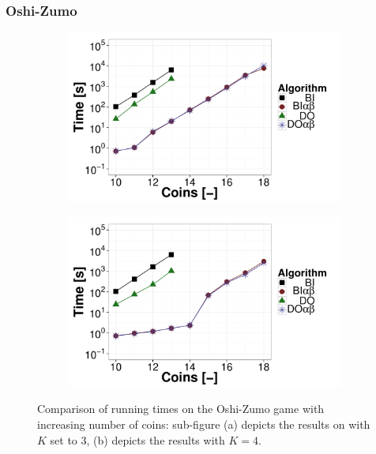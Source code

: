 \subsubsection{Oshi-Zumo}
\begin{figure}
\centering
	\begin{subfigure}{0.49\textwidth}
		\includegraphics[width=1\textwidth]{figures/OZ-K3.pdf}\caption{}\label{fig:off:res:oz3}
	\end{subfigure}
	\begin{subfigure}{0.49\textwidth}
		\includegraphics[width=1\textwidth]{figures/OZ-K4.pdf}\caption{}\label{fig:off:res:oz4}
	\end{subfigure}
\caption{Comparison of running times on the Oshi-Zumo game with increasing number of coins: sub-figure (a) depicts the results on with $K$ set to $3$, (b) depicts the results with $K=4$.} \label{fig:off:res:oz}
\end{figure}

